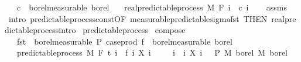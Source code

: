 \begin{isabellebody}
\ \ \ {\isachardoublequoteopen}c\ {\isasymin}\ borel{\isacharunderscore}{\kern0pt}measurable\ borel{\isachardoublequoteclose}\isanewline
\ \ \ {\isachardoublequoteopen}real{\isacharunderscore}{\kern0pt}predictable{\isacharunderscore}{\kern0pt}process\ M\ F\ {\isacharparenleft}{\kern0pt}{\isasymlambda}i\ {\isacharunderscore}{\kern0pt}{\isachardot}{\kern0pt}\ c\ i{\isacharparenright}{\kern0pt}{\isachardoublequoteclose}\isanewline
%
\isadelimproof
\ \ %
\endisadelimproof
%
\isatagproof
{}\isamarkupfalse%
\ assms\ \isamarkupfalse%
\ {\isacharparenleft}{\kern0pt}intro\ predictable{\isacharunderscore}{\kern0pt}process{\isacharunderscore}{\kern0pt}const{\isacharbrackleft}{\kern0pt}OF\ measurable{\isacharunderscore}{\kern0pt}predictable{\isacharunderscore}{\kern0pt}sigma{\isacharunderscore}{\kern0pt}fst{\isacharcomma}{\kern0pt}\ THEN\ real{\isacharunderscore}{\kern0pt}predictable{\isacharunderscore}{\kern0pt}process{\isachardot}{\kern0pt}intro{\isacharbrackright}{\kern0pt}{\isacharparenright}{\kern0pt}%
\endisatagproof
{\isafoldproof}%
%
\isadelimproof
\isanewline
%
\endisadelimproof
\isanewline
{}\isamarkupfalse%
\ predictable{\isacharunderscore}{\kern0pt}process\isanewline
{}\isanewline
\isanewline
{}\isamarkupfalse%
\ compose{\isacharcolon}{\kern0pt}\isanewline
\ \ \ {\isachardoublequoteopen}fst\ {\isasymin}\ borel{\isacharunderscore}{\kern0pt}measurable\ {\isasymSigma}\isactrlsub P{\isachardoublequoteclose}\ {\isachardoublequoteopen}case{\isacharunderscore}{\kern0pt}prod\ f\ {\isasymin}\ borel{\isacharunderscore}{\kern0pt}measurable\ borel{\isachardoublequoteclose}\isanewline
\ \ \ {\isachardoublequoteopen}predictable{\isacharunderscore}{\kern0pt}process\ M\ F\ t\ {\isacharparenleft}{\kern0pt}{\isasymlambda}i\ {\isasymxi}{\isachardot}{\kern0pt}\ {\isacharparenleft}{\kern0pt}f\ i{\isacharparenright}{\kern0pt}\ {\isacharparenleft}{\kern0pt}X\ i\ {\isasymxi}{\isacharparenright}{\kern0pt}{\isacharparenright}{\kern0pt}{\isachardoublequoteclose}\isanewline
%
\isadelimproof
%
\endisadelimproof
%
\isatagproof
{}\isamarkupfalse%
\isanewline
\ \ \isamarkupfalse%
\ {\isachardoublequoteopen}{\isacharparenleft}{\kern0pt}{\isasymlambda}{\isacharparenleft}{\kern0pt}i{\isacharcomma}{\kern0pt}\ {\isasymxi}{\isacharparenright}{\kern0pt}{\isachardot}{\kern0pt}\ {\isacharparenleft}{\kern0pt}i{\isacharcomma}{\kern0pt}\ X\ i\ {\isasymxi}{\isacharparenright}{\kern0pt}{\isacharparenright}{\kern0pt}\ {\isasymin}\ {\isasymSigma}\isactrlsub P\ {\isasymrightarrow}\isactrlsub M\ borel\ {\isasymOtimes}\isactrlsub M\ borel{\isachardoublequoteclose}\ \isamarkupfalse%

\end{isabellebody}
